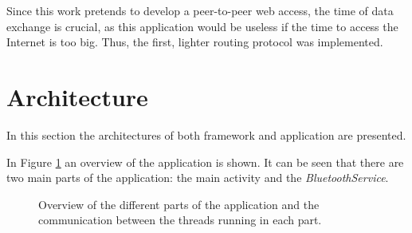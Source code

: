 Since this work pretends to develop a peer-to-peer web access, the time of data exchange is crucial, as this application would be useless if the time to access the Internet is too big. Thus, the first, lighter routing protocol was implemented.

\section{Architecture}
\label{sec:architecture}

In this section the architectures of both framework and application are presented.

In Figure \ref{fig:appsandbox} an overview of the application is shown. It can be seen that there are two main parts of the application: the main activity and the \textit{BluetoothService}.

\begin{figure}[ht]
	\noindent{}
	\caption{\label{fig:appsandbox} Overview of the different parts of the application and the communication between the threads running in each part.}
\end{figure}

